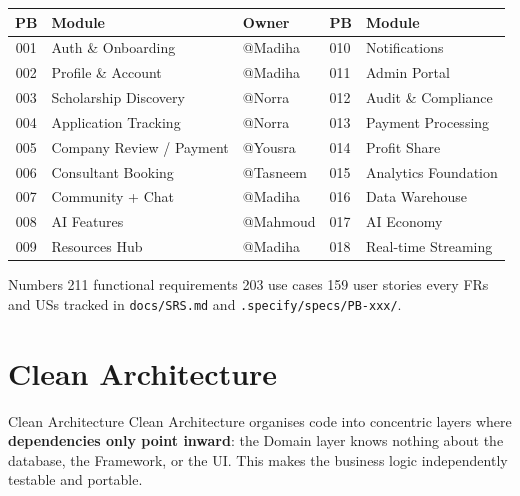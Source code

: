 \documentclass[11pt,a4paper]{article}
\begin{document}
\begin{center}
\begin{tabular}{cllll}
\toprule
\textbf{PB} & \textbf{Module} & \textbf{Owner} & \textbf{PB} & \textbf{Module}\\
\midrule
001 & Auth \& Onboarding       & @Madiha   & 010 & Notifications\\
002 & Profile \& Account       & @Madiha   & 011 & Admin Portal\\
003 & Scholarship Discovery    & @Norra    & 012 & Audit \& Compliance\\
004 & Application Tracking     & @Norra    & 013 & Payment Processing\\
005 & Company Review / Payment & @Yousra   & 014 & Profit Share\\
006 & Consultant Booking       & @Tasneem  & 015 & Analytics Foundation\\
007 & Community + Chat         & @Madiha   & 016 & Data Warehouse\\
008 & AI Features              & @Mahmoud  & 017 & AI Economy\\
009 & Resources Hub            & @Madiha   & 018 & Real-time Streaming\\
\bottomrule
\end{tabular}
\end{center}

\begin{keybox}{Numbers}
211 functional requirements \textperiodcentered{}
203 use cases \textperiodcentered{}
159 user stories \textperiodcentered{}
every FRs and USs tracked in \texttt{docs/SRS.md} and \texttt{.specify/specs/PB-xxx/}.
\end{keybox}

\section{Clean Architecture}

\begin{conceptbox}{Clean Architecture}
Clean Architecture organises code into concentric layers where
\textbf{dependencies only point inward}: the Domain layer knows nothing
about the database, the Framework, or the UI.
This makes the business logic independently testable and portable.
\end{conceptbox}
\end{document}
